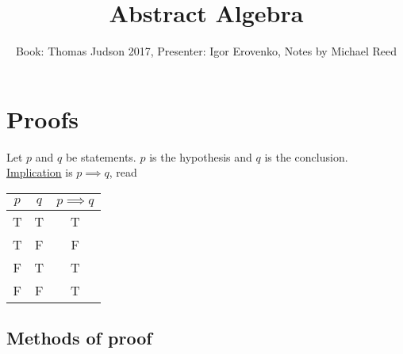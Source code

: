 \documentclass[]{article}
\author{Book: Thomas Judson 2017, Presenter: Igor Erovenko, Notes by Michael Reed}
\title{Abstract Algebra}
\begin{document}
\maketitle


\section{Proofs}

Let $p$ and $q$ be statements.  $p$ is the hypothesis and $q$ is the conclusion. \ul{Implication} is $p\implies q$, read 

\begin{tabular}{|c|c|c|}
	\hline 
	$p$ & $q$ & $p\implies q$ \\ 
	\hline 
	T & T & T \\ 
	\hline 
	T & F & F \\ 
	\hline 
	F & T & T \\ 
	\hline 
	F & F & T \\ 
	\hline 
\end{tabular}

\subsection*{Methods of proof}
\end{document}
